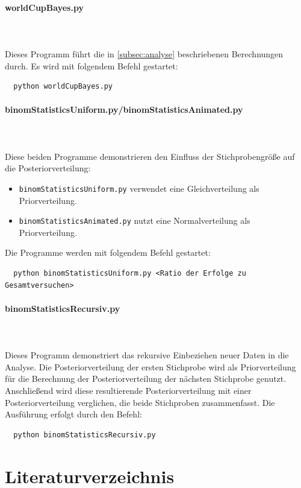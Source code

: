 \documentclass[a4paper,12pt]{article}
\begin{document}
\paragraph{worldCupBayes.py} \mbox{}\\\\
Dieses Programm führt die in \autoref{subsec:analyse} beschriebenen Berechnungen durch.
Es wird mit folgendem Befehl gestartet:
\begin{lstlisting}
  python worldCupBayes.py
\end{lstlisting}

\paragraph{binomStatisticsUniform.py/binomStatisticsAnimated.py} \mbox{}\\\\
Diese beiden Programme demonstrieren den Einfluss der Stichprobengröße auf die Posteriorverteilung:

\begin{itemize}
\item \texttt{binomStatisticsUniform.py} verwendet eine Gleichverteilung als Priorverteilung.
\item \texttt{binomStatisticsAnimated.py} nutzt eine Normalverteilung als Priorverteilung.
\end{itemize}

Die Programme werden mit folgendem Befehl gestartet:
\begin{lstlisting}
  python binomStatisticsUniform.py <Ratio der Erfolge zu Gesamtversuchen>
\end{lstlisting}

\paragraph{binomStatisticsRecursiv.py} \mbox{}\\\\
Dieses Programm demonstriert das rekursive Einbeziehen neuer Daten in die Analyse. Die Posteriorverteilung der ersten Stichprobe wird als Priorverteilung für die Berechnung der Posteriorverteilung der nächsten Stichprobe genutzt. Anschließend wird diese resultierende Posteriorverteilung mit einer Posteriorverteilung verglichen, die beide Stichproben zusammenfasst. Die Ausführung erfolgt durch den Befehl:
\begin{lstlisting}
  python binomStatisticsRecursiv.py
\end{lstlisting}

\newpage

\section{Literaturverzeichnis} 

\printbibliography
\end{document}
